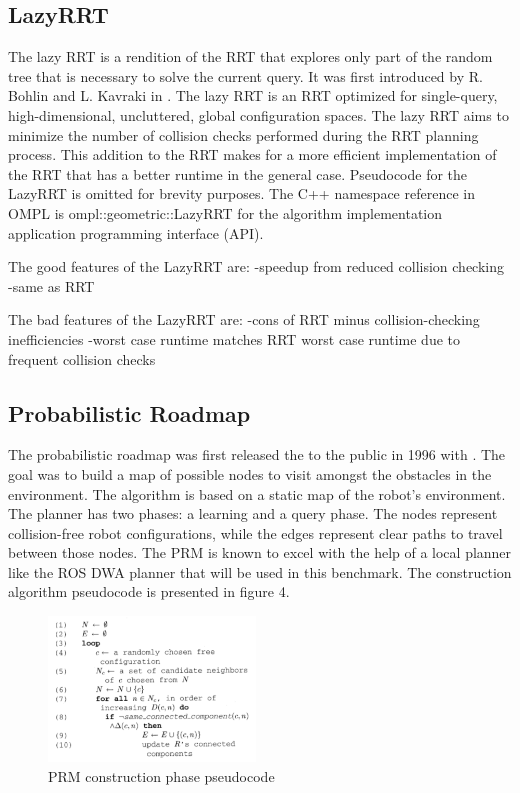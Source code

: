 \documentclass[conference]{IEEEtran} \usepackage[T1]{fontenc} \usepackage[backend=biber, style=ieee]{biblatex}
\begin{document}
\subsection{LazyRRT} \label{LazyRRT}
The lazy RRT is a rendition of the RRT that explores only part of the random tree that is necessary to solve the current query. It was first introduced by R. Bohlin and 
L. Kavraki in \cite{lazy_rrt}. The lazy RRT is an RRT optimized for single-query, high-dimensional, uncluttered, global configuration spaces. The lazy RRT aims to 
minimize the number of collision checks performed during the RRT planning process. This addition to the RRT makes for a more efficient implementation of the RRT that has 
a better runtime in the general case. Pseudocode for the LazyRRT is omitted for brevity purposes. The C++ namespace reference in OMPL is ompl::geometric::LazyRRT for
the algorithm implementation application programming interface (API).

The good features of the LazyRRT are:
-speedup from reduced collision checking
-same as RRT

The bad features of the LazyRRT are:
-cons of RRT minus collision-checking inefficiencies
-worst case runtime matches RRT worst case runtime due to frequent collision checks

\subsection{Probabilistic Roadmap} \label{PRM}
The probabilistic roadmap was first released the to the public in 1996 with \cite{prm}. The goal was to build a map of possible nodes to visit amongst the obstacles in 
the environment. The algorithm is based on a static map of the robot's environment. The planner has two phases: a learning and a query phase. The nodes represent 
collision-free robot configurations, while the edges represent clear paths to travel between those nodes. The PRM is known to excel with the help of a local planner like 
the ROS DWA planner that will be used in this benchmark. The construction algorithm pseudocode is presented in figure 4.

\begin{figure}
\label{figure4} 
\centering 
\includegraphics[width=0.49\textwidth]{prm}
\caption{PRM construction phase pseudocode}
\end{figure}
\end{document}

